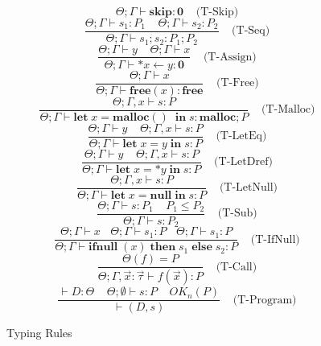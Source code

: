 \documentclass[english]{jssst_ppl} %
\newcommand\LET{\mathbf{let}\;}
\newcommand\IN{\mathbf{in}\;}
\newcommand\SKIP{\mathbf{skip}}
\newcommand\Rtab{\; \; \; \;}
\newcommand\IFNULL{\mathbf{ifnull}\;}
\newcommand\THEN{\mathbf{then}\;}
\newcommand\ELSE{\mathbf{else}\;}
\newcommand\MALLOC{\mathbf{malloc()}\;}
\newcommand\Malloc{\mathbf{malloc}}
\newcommand\Free{\mathbf{free}}
\theoremstyle{definition}
\begin{document}
\begin{figure}
\begin{minipage}{12cm}

$$
         \Theta ; \Gamma \vdash \SKIP : \mathbf{0}
      \Rtab \mbox{(T-Skip)}
$$
$$
      \frac{\Theta ; \Gamma \vdash s_{1} : P_{1} \Rtab \Theta ; \Gamma \vdash s_{2} : P_{2}}
          {\Theta ; \Gamma \vdash s_{1} ; s_{2} : P_{1};P_{2} }
     \Rtab \mbox{(T-Seq)}
$$
$$
     \frac{\Theta ; \Gamma \vdash y  \Rtab \Theta ; \Gamma \vdash x }
          {\Theta ; \Gamma \vdash *x \leftarrow y : \mathbf{0} }
     \Rtab \mbox{(T-Assign)}
$$
$$
     \frac{\Theta ; \Gamma \vdash x  }
           {\Theta ; \Gamma \vdash \Free(x) : \Free}
     \Rtab \mbox{(T-Free)}
$$
$$
     \frac{\Theta ; \Gamma,x \vdash s : P}
           {\Theta ; \Gamma \vdash \LET x = \MALLOC \; \IN s  : \Malloc;P}
           \Rtab \mbox{(T-Malloc)}
$$
$$
     \frac{\Theta ; \Gamma \vdash y   \Rtab \Theta ; \Gamma , x  \vdash s : P}
           {\Theta ; \Gamma \vdash \LET x = y \; \IN s : P}
     \Rtab \mbox{(T-LetEq)}
$$
$$
     \frac{\Theta ; \Gamma \vdash y  \Rtab \Theta ; \Gamma , x  \vdash s : P}
           {\Theta ; \Gamma \vdash \LET x = *y \; \IN s : P}
     \Rtab \mbox{(T-LetDref)}
$$
$$
     \frac{\Theta ; \Gamma, x  \vdash s : P}
           {\Theta ; \Gamma \vdash \LET x = \mathbf{null} \; \IN s : P}
     \Rtab \mbox{(T-LetNull)}
$$
$$
     \frac{\Theta ; \Gamma \vdash s : P_{1} \Rtab P_{1} \le P_{2}}
            {\Theta ; \Gamma \vdash s : P_{2}}
     \Rtab \mbox{(T-Sub)}
$$
$$
     \frac{\Theta ; \Gamma \vdash x    \ \ \ \  \Theta ; \Gamma \vdash s_{1} : P \ \ \ \ \Theta ; \Gamma \vdash s_{1} : P}
           {\Theta ; \Gamma \vdash \IFNULL(x) \; \THEN s_{1}\; \ELSE s_{2} : P}
     \Rtab \mbox{(T-IfNull)}
$$
$$ \frac{ \Theta(f) = P}
{\Theta; \Gamma, \vec{x} : \vec{\tau} \vdash f(\vec{x}) : P}
\Rtab \mbox{(T-Call)} $$
$$\frac{\vdash D : \Theta \;\;\;\; \Theta; \emptyset\vdash s : P \Rtab OK_{n}(P)}
{\vdash (D, s)}
\Rtab \mbox{(T-Program)} $$
\end{minipage}
\caption{Typing Rules}
\label{fig:typingrules}
\end{figure}
\end{document}
